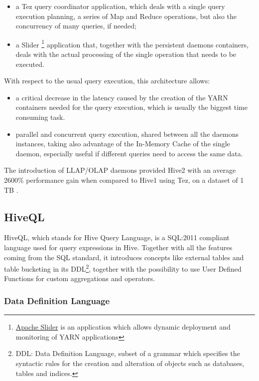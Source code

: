 \begin{itemize}
    \item a Tez query coordinator application, which deals with a single query execution planning, a series of Map and Reduce operations, but also the concurrency of many queries, if needed;
    \item a Slider \footnote{\href{https://slider.incubator.apache.org/}{Apache Slider} is an application which allows dynamic deployment and monitoring of YARN applications} application that, together with the persistent daemons containers, deals with the actual processing of the single operation that needs to be executed.
\end{itemize}

With respect to the usual query execution, this architecture allows:

\begin{itemize} 
	\item a critical decrease in the latency caused by the creation of the YARN containers needed for the query execution, which is usually the biggest time consuming task.
	\item parallel and concurrent query execution, shared between all the daemons instances, taking also advantage of the In-Memory Cache of the single daemon, especially useful if different queries need to access the same data.
\end{itemize}

The introduction of LLAP/OLAP daemons provided Hive2 with an average 2600\% performance gain when compared to Hive1 using Tez, on a dataset of 1 TB \cite{hive2_on_tez}.

\subsection{HiveQL}

HiveQL, which stands for Hive Query Language, is a SQL:2011 compliant language used for query expressions in Hive. Together with all the features coming from the SQL standard, it introduces concepts like external tables and table bucketing in its DDL\footnote{DDL: Data Definition Language, subset of a grammar which specifies the syntactic rules for the creation and alteration of objects such as databases, tables and indices.}, together with the possibility to use User Defined Functions for custom aggregations and operators.

\subsubsection{Data Definition Language}

